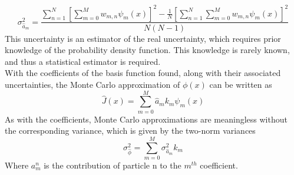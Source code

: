 \documentclass[10tma4paper]{article}
\begin{document}
	\begin{equation} \label{eq:5}
	\sigma_{\hat{a}_{m}}^2 = \frac{\sum_{n=1}^{N}[\sum_{m=0}^{M}w_{m,n}\psi_{m}(x)]^{2} - \frac{1}{N}[ \sum_{n=1}^{N}\sum_{m=0}^{M}w_{m,n}\psi_{m}(x)]^{2}}{N(N-1)}
	\end{equation}
This uncertainty is an estimator of the real uncertainty, which requires prior knowledge of the probability density function. This knowledge is rarely known, and thus a statistical estimator is required.
\\With the coefficients of the basis function found, along with their associated uncertainties, the Monte Carlo approximation of $\phi(x)$ can be written as
	\begin{equation} \label{eq:6}
	\hat{J}(x) = \sum_{m=0}^{M} \hat{a}_{m}k_{m}\psi_{m}(x)
	\end{equation}
As with the coefficients, Monte Carlo approximations are meaningless without the corresponding variance, which is given by the two-norm variances
	\begin{equation} \label{eq:7}
	\sigma_{\hat{\phi}}^2=\sum_{m=0}^{M}\sigma_{\hat{a}_{m}}^2k_{m}
	\end{equation}
Where $a_{m}^{n}$ is the contribution of particle n to the $m^{th}$ coefficient.
\end{document}
